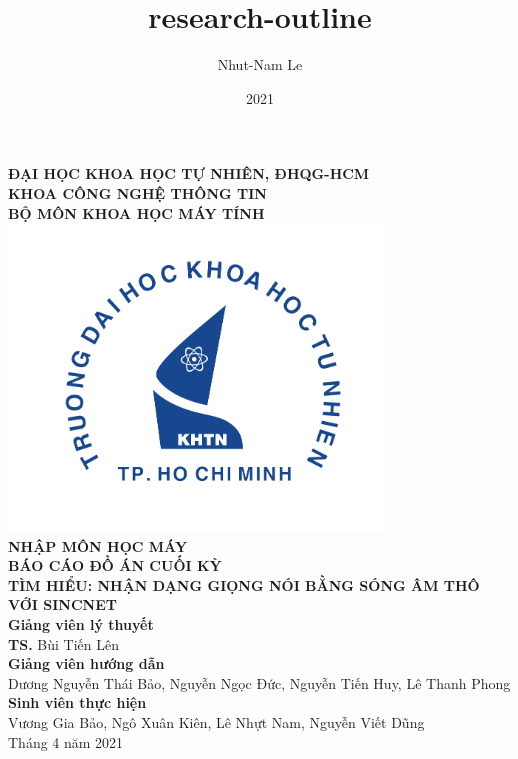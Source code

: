 \documentclass{article}
\title{research-outline}
\author{Nhut-Nam Le}
\date{2021}
\newcommand\B{\rule[-1.2ex]{0pt}{0pt}} %
\begin{document}
	\begin{titlepage}
		\begin{center}
			\large{\textbf{ĐẠI HỌC KHOA HỌC TỰ NHIÊN, ĐHQG-HCM\\KHOA CÔNG NGHỆ THÔNG TIN\\BỘ MÔN KHOA HỌC MÁY TÍNH}}\\
			\includegraphics[width=0.75\textwidth]{images/khtn.png}\\
			\large \textbf{NHẬP MÔN HỌC MÁY}\\[0.1in]
			\huge \textbf{BÁO CÁO ĐỒ ÁN CUỐI KỲ}\\[0.1in]
			\huge \textbf{TÌM HIỂU: NHẬN DẠNG GIỌNG NÓI BẰNG SÓNG ÂM THÔ VỚI SINCNET}\\[0.1in]
			\vfill
			\normalsize
			\normalsize
			\textbf{Giảng viên lý thuyết}\\
			{\textbf{TS.} Bùi Tiến Lên}\\[0.1in]
			\textbf{Giảng viên hướng dẫn}\\
			\vspace{0.1in}
			{Dương Nguyễn Thái Bảo, Nguyễn Ngọc Đức, Nguyễn Tiến Huy, Lê Thanh Phong}\\[0.1in]
			\textbf{Sinh viên thực hiện} \\
			\vspace{0.1in}
			{Vương Gia Bảo, Ngô Xuân Kiên, Lê Nhựt Nam, Nguyễn Viết Dũng}\\[0.1in]
			\vfill
			Tháng 4 năm 2021
		\end{center}
	\end{titlepage}
	\newpage
	
	\cleardoublepage
\end{document}
